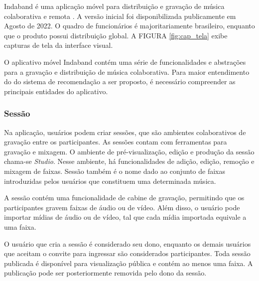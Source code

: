 Indaband é uma aplicação móvel para distribuição e gravação de música
colaborativa e remota \cite{indaband}. A versão inicial foi disponibilizada
publicamente em Agosto de 2022. O quadro de funcionários é majoritariamente
brasileiro, enquanto que o produto possui distribuição global. A FIGURA
\ref{fig:cap_tela} exibe capturas de tela da interface visual.


O aplicativo móvel Indaband contém uma série de funcionalidades e abstrações
para a gravação e distribuição de música colaborativa. Para maior entendimento
do do sistema de recomendação a ser proposto, é necessário compreender as
principais entidades do aplicativo.


\subsubsection{Sessão}

Na aplicação, usuários podem criar sessões, que são ambientes colaborativos de
gravação entre os participantes. As sessões contam com ferramentas para gravação
e mixagem. O ambiente de pré-visualização, edição e produção da sessão chama-se
\textit{Studio}. Nesse ambiente, há funcionalidades de adição, edição,
remoção e mixagem de faixas. Sessão também é o nome dado ao conjunto de faixas
introduzidas pelos usuários que constituem uma determinada música.

A sessão contém uma funcionalidade de cabine de gravação, permitindo que os
participantes gravem faixas de áudio ou de vídeo. Além disso, o usuário pode
importar mídias de áudio ou de vídeo, tal que cada mídia importada equivale a
uma faixa.

O usuário que cria a sessão é considerado seu dono, enquanto os demais usuários
que aceitam o convite para ingressar são considerados participantes. Toda sessão
publicada é disponível para visualização pública e contém ao menos uma faixa. A
publicação pode ser posteriormente removida pelo dono da sessão.


